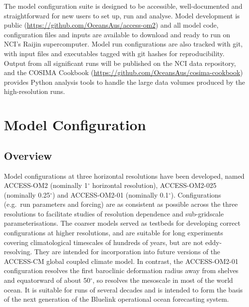 \documentclass[11pt]{article}
\newcommand{\CONTRIBUTORS}[1]{\note{\textcolor{BurntOrange}{\textsf{\textsl{CONTRIBUTORS: #1}}}}}
\begin{document}
The model configuration suite is designed to be accessible, well-documented and straightforward for new users to set up, run and analyse.
Model development is public (\url{https://github.com/OceansAus/access-om2}) and all model code, configuration files and inputs are available to download and ready to run on NCI's Raijin supercomputer.
Model run configurations are also tracked with git, with input files and executables tagged with git hashes for reproducibility.
Output from all significant runs will be published on the NCI data repository, and the COSIMA Cookbook (\url{https://github.com/OceansAus/cosima-cookbook}) provides Python analysis tools to handle the large data volumes produced by the high-resolution runs.

\section{Model Configuration}
\CONTRIBUTORS{Andrew Kiss to coordinate}

\subsection{Overview}

Model configurations at three horizontal resolutions have been developed, named ACCESS-OM2 (nominally 1$^\circ$ horizontal resolution), ACCESS-OM2-025 (nominally 0.25$^\circ$) and ACCESS-OM2-01 (nominally 0.1$^\circ$).
Configurations (e.g.\ run parameters and forcing) are as consistent as possible across the three resolutions to facilitate studies of resolution dependence and sub-gridscale parameterisations. 
The coarser models served as testbeds for developing correct configurations at higher resolutions, and are suitable for long experiments covering climatological timescales of hundreds of years, but are not eddy-resolving.
They are intended for incorporation into future versions of the ACCESS-CM global coupled climate model.
In contrast, the ACCESS-OM2-01 configuration resolves the first baroclinic deformation radius away from shelves and equatorward of about 50$^\circ$\citep{Hallberg2013a}, so resolves the mesoscale in most of the world ocean. It is suitable for runs of several decades and is intended to form the basis of the next generation of the Bluelink operational ocean forecasting system.
\end{document}
